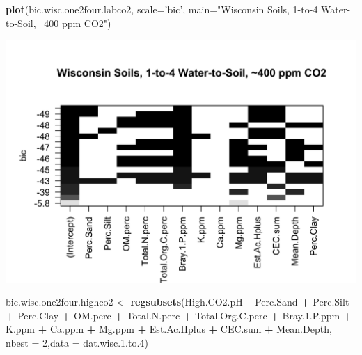 \documentclass[]{article}
\newenvironment{Shaded}{\begin{snugshade}}{\end{snugshade}}
\newcommand{\DataTypeTok}[1]{\textcolor[rgb]{0.13,0.29,0.53}{#1}}
\newcommand{\DecValTok}[1]{\textcolor[rgb]{0.00,0.00,0.81}{#1}}
\newcommand{\FloatTok}[1]{\textcolor[rgb]{0.00,0.00,0.81}{#1}}
\newcommand{\KeywordTok}[1]{\textcolor[rgb]{0.13,0.29,0.53}{\textbf{#1}}}
\newcommand{\NormalTok}[1]{#1}
\newcommand{\OperatorTok}[1]{\textcolor[rgb]{0.81,0.36,0.00}{\textbf{#1}}}
\newcommand{\StringTok}[1]{\textcolor[rgb]{0.31,0.60,0.02}{#1}}
\begin{document}
\begin{Shaded}
\begin{Highlighting}[]
\KeywordTok{plot}\NormalTok{(bic.wisc.one2four.labco2, }\DataTypeTok{scale=}\StringTok{'bic'}\NormalTok{, }\DataTypeTok{main=}\StringTok{"Wisconsin Soils, 1-to-4 Water-to-Soil, ~400 ppm CO2"}\NormalTok{)}
\end{Highlighting}
\end{Shaded}

\includegraphics{output-rmd/bic.wisc.one2four.labco2-1.png}

\begin{Shaded}
\begin{Highlighting}[]
\NormalTok{bic.wisc.one2four.highco2 <-}\StringTok{ }\KeywordTok{regsubsets}\NormalTok{(High.CO2.pH }\OperatorTok{~}\StringTok{ }\NormalTok{Perc.Sand }\OperatorTok{+}\StringTok{ }\NormalTok{Perc.Silt }\OperatorTok{+}\StringTok{ }\NormalTok{Perc.Clay }\OperatorTok{+}\StringTok{ }\NormalTok{OM.perc }\OperatorTok{+}\StringTok{ }\NormalTok{Total.N.perc }\OperatorTok{+}\StringTok{ }\NormalTok{Total.Org.C.perc }\OperatorTok{+}\StringTok{ }\NormalTok{Bray.}\FloatTok{1.}\NormalTok{P.ppm }\OperatorTok{+}\StringTok{ }\NormalTok{K.ppm }\OperatorTok{+}\StringTok{ }\NormalTok{Ca.ppm }\OperatorTok{+}\StringTok{ }\NormalTok{Mg.ppm }\OperatorTok{+}\StringTok{ }\NormalTok{Est.Ac.Hplus }\OperatorTok{+}\StringTok{ }\NormalTok{CEC.sum }\OperatorTok{+}\StringTok{ }\NormalTok{Mean.Depth, }\DataTypeTok{nbest =} \DecValTok{2}\NormalTok{,}\DataTypeTok{data =}\NormalTok{ dat.wisc.}\FloatTok{1.}\NormalTok{to}\FloatTok{.4}\NormalTok{)}
\end{Highlighting}
\end{Shaded}
\end{document}
